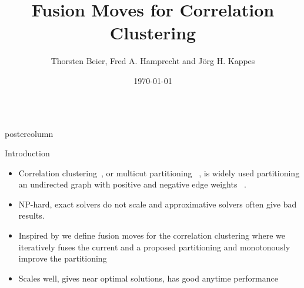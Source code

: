 \documentclass[final,hyperref={pdfpagelabels=false}]{beamer}
\title{\huge Fusion Moves for Correlation Clustering}
\author{Thorsten Beier, Fred A. Hamprecht and J\"org H. Kappes }
\institute[RWTH Aachen University]{Heidelberg Collaboratory for Image Processing, University of Heidelberg, Germany}
\date[\today]{\today}
\newlength{\columnheight}
\begin{document}
\begin{frame}
  \begin{columns}
    \begin{column}{.49\textwidth}
      \begin{beamercolorbox}[center,wd=\textwidth]{postercolumn}
        \begin{minipage}[T]{.95\textwidth}  %
          \parbox[t][\columnheight]{\textwidth}{ %
            \begin{block}{Introduction}

            \small  
            \begin{itemize}
                \item  Correlation clustering~\cite{Bansal-2002}, or multicut partitioning~\cite{chopra_1993_mp} ,
                is widely used partitioning an undirected graph with positive and negative edge weights
                ~\cite{andres_2011_iccv,kroeger_2012_eccv,yarkony_2012_eccv,alush_2013_simbad}. 
                \item NP-hard,  exact solvers do not scale and approximative solvers often give bad results.
                \item Inspired by \cite{Lempitsky-2010} we define fusion moves for the correlation clustering
                where we iteratively fuses the current and a proposed partitioning and monotonously improve the partitioning
                \item Scales well, gives near optimal solutions, has good anytime performance
            \end{itemize}

           

\end{block}}
\end{minipage}
\end{beamercolorbox}
\end{column}
\end{columns}
\end{frame}
\end{document}
